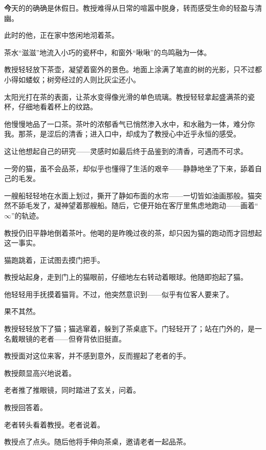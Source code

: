 
\AddSymbolsD
\pagecolor{Goldenrod!20!Gray}
\color{white}
\quad\quad \lettrine[,lraise=0.2,lhang=0.5]{\textbf{今}}{天}的的确确是休假日。教授难得从日常的喧嚣中脱身，转而感受生命的轻盈与清幽。

此时的他，正在家中悠闲地沏着茶。

茶水“滋滋”地流入小巧的瓷杯中，和窗外“啾啾”的鸟鸣融为一体。

教授轻轻放下茶壶，凝望着窗外的景色。地面上涂满了笔直的树的光影，只不过都小得如蝼蚁；树旁经过的人则比灰尘还小。

太阳光打在茶的表面，让茶水变得像光滑的单色琉璃。教授轻轻拿起盛满茶的瓷杯，仔细地看着杯上的纹路。

他慢慢地品了一口茶。茶叶的浓郁香气已悄然渗入水中，和水融为一体，难分你我。那茶，是涩后的清香；进入口中，却成为了教授心中近乎永恒的感受。

这让他想起自己的研究——灵感时如最后终于品鉴到的清香，可遇而不可求。

一旁的猫，虽不会品茶，却似乎也懂得了生活的艰辛——静静地坐了下来，舔着自己的毛发。

一艘船轻轻地在水面上划过，撕开了静如布面的水帘——一切皆如油画那般。猫突然不舔毛发了，凝神望着那艘船。随后，它便开始在客厅里焦虑地跑动——画着“\(\infty\)”的轨迹。

教授仍旧平静地倒着茶叶。他喝的是昨晚过夜的茶，却只因为猫的跑动而才回想起这一事实。

猫跑跳着，正试图去摸门把手。

教授站起身，走到门上的猫眼前，仔细地左右转动着眼球。他随即抱起了猫。

他轻轻用手抚摸着猫背。不过，他突然意识到——似乎有位客人要来了。


果不其然。

教授轻轻放下了猫；猫逃窜着，躲到了茶桌底下。门轻轻开了；站在门外的，是一名戴眼镜的老者——但脊背依旧挺直。

教授面对这位来客，并不感到意外，反而握起了老者的手。

教授颇显高兴地说着。


老者推了推眼镜，同时踏进了玄关，问着。

教授回答着。

老者转头看着教授。老者说着。

教授点了点头。随后他将手伸向茶桌，邀请老者一起品茶。

